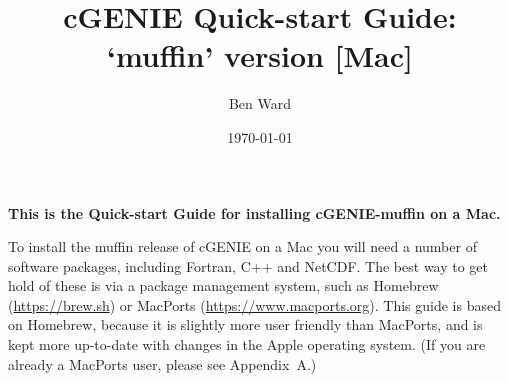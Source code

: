 \documentclass[10pt,twoside]{article}
\title{cGENIE Quick-start Guide: `muffin' version [Mac]}
\author{Ben Ward}
\date{\today}
\begin{document}

\maketitle


\noindent \textbf{This is the Quick-start Guide for installing cGENIE-muffin on a Mac.}

\noindent To install the muffin release of cGENIE on a Mac you will need a number of software packages, including Fortran, C++ and NetCDF. The best way to get hold of these is via a package management system, such as Homebrew (\href{}{https://brew.sh}) or MacPorts (\href{}{https://www.macports.org}). This guide is based on Homebrew, because it is slightly more user friendly than MacPorts, and is kept more up-to-date with changes in the Apple operating system. (If you are already a MacPorts user, please see Appendix~A.)
\end{document}
